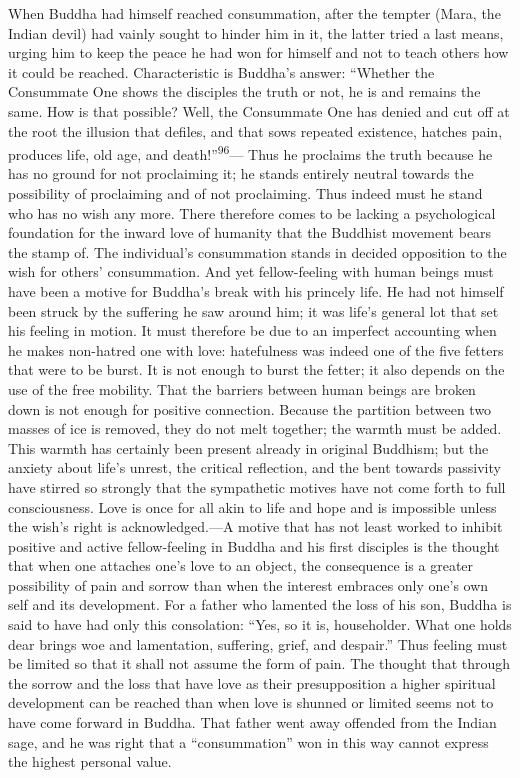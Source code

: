 \documentclass[12pt,a4paper]{book}
\newcommand{\opage}[1]{\marginnote{\footnotesize\textit{[#1]}}}
\begin{document}
When Buddha had himself reached consummation, after the tempter (Mara, the Indian devil) had vainly
sought to hinder him in it, the latter tried a last means, urging him to keep the peace he had won for
himself and not to teach others how it could be reached. Characteristic is Buddha's answer: ``Whether
the Consummate One shows the disciples the truth or not, he is and remains the same. How is that
possible? Well, the Consummate One has denied and cut off at the root the illusion that defiles, and
that sows repeated existence, hatches pain, produces life, old age, and death!''\textsuperscript{96}---%
Thus he proclaims the truth because he has no ground for not proclaiming it; he stands entirely neutral
towards the possibility of proclaiming and of not proclaiming. Thus indeed must he stand who has no wish
any more. There therefore comes to be lacking a psychological foundation for the inward love of humanity
that the Buddhist movement bears the stamp of. The individual's consummation stands in decided
opposition to the wish for others' consummation. And yet fellow-feeling with human beings must have been
a motive for Buddha's break with his princely life. He had not himself been struck by the suffering he
saw around him; it was life's general lot that set his feeling in motion. It must therefore be due to an
imperfect accounting when he makes non-hatred one with love: hatefulness was indeed one of the five
fetters that were to be burst. It is not enough to burst 
\opage{197}the fetter; it also depends on the use of the
free mobility. That the barriers between human beings are broken down is not enough for positive
connection. Because the partition between two masses of ice is removed, they do not melt together; the
warmth must be added. This warmth has certainly been present already in original Buddhism; but the
anxiety about life's unrest, the critical reflection, and the bent towards passivity have stirred so
strongly that the sympathetic motives have not come forth to full consciousness. Love is once for all
akin to life and hope and is impossible unless the wish's right is acknowledged.---A motive that has not
least worked to inhibit positive and active fellow-feeling in Buddha and his first disciples is the
thought that when one attaches one's love to an object, the consequence is a greater possibility of pain
and sorrow than when the interest embraces only one's own self and its development. For a father who
lamented the loss of his son, Buddha is said to have had only this consolation: ``Yes, so it is,
householder. What one holds dear brings woe and lamentation, suffering, grief, and despair.'' Thus
feeling must be limited so that it shall not assume the form of pain. The thought that through the sorrow
and the loss that have love as their presupposition a higher spiritual development can be reached than
when love is shunned or limited seems not to have come forward in Buddha. That father went away offended
from the Indian sage, and he was right that a ``consummation'' won in this way cannot express the highest
personal value.
\end{document}
